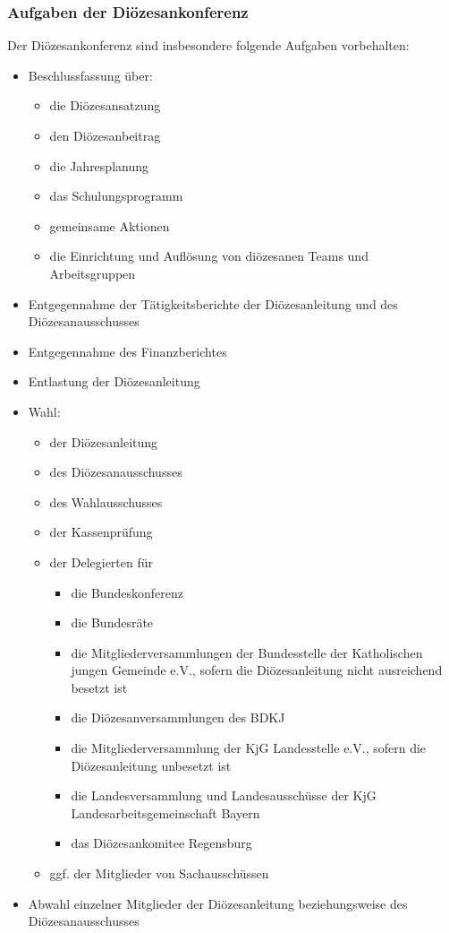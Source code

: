 \documentclass[12pt]{report}
\begin{document}
\begin{justify}
\subsubsection{Aufgaben der Diözesankonferenz}
Der Diözesankonferenz sind insbesondere folgende Aufgaben vorbehalten:
\begin{itemize} 
  \item Beschlussfassung über:
    \begin{itemize} 
      \item die Diözesansatzung
      \item den Diözesanbeitrag
      \item die Jahresplanung
      \item das Schulungsprogramm
      \item gemeinsame Aktionen
      \item die Einrichtung und Auflösung von diözesanen Teams und Arbeitsgruppen
    \end{itemize}
  \item Entgegennahme der Tätigkeitsberichte der Diözesanleitung und des Diözesanausschusses
  \item Entgegennahme des Finanzberichtes
  \item Entlastung der Diözesanleitung
  \item Wahl:
    \begin{itemize}
      \item der Diözesanleitung
      \item des Diözesanausschusses
      \item des Wahlausschusses
      \item der Kassenprüfung
      \item der Delegierten für
            \begin{itemize}
              \item die Bundeskonferenz
              \item die Bundesräte
              \item die Mitgliederversammlungen der Bundesstelle der
                    Katholischen jungen Gemeinde e.V., sofern die
                    Diözesanleitung nicht ausreichend besetzt ist
              \item die Diözesanversammlungen des BDKJ
              \item die Mitgliederversammlung der KjG Landesstelle e.V., sofern
                    die Diözesanleitung unbesetzt ist
              \item die Landesversammlung und Landesausschüsse der KjG
                    Landesarbeitsgemeinschaft Bayern
              \item das Diözesankomitee Regensburg
            \end{itemize}
            \item ggf. der Mitglieder von Sachausschüssen
    \end{itemize}
  \item Abwahl einzelner Mitglieder der Diözesanleitung beziehungsweise des Diözesanausschusses
\end{itemize}

\end{justify}
\end{document}
